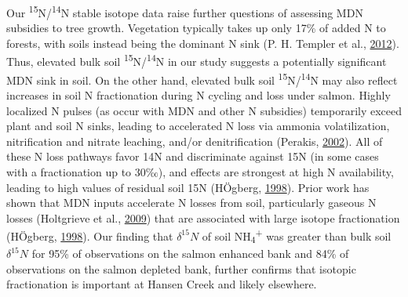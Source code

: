 \documentclass [11pt, proquest] {uwthesis}[2015/03/03]
\begin{document}
Our \textsuperscript{15}N/\textsuperscript{14}N stable isotope data
raise further questions of assessing MDN subsidies to tree growth.
Vegetation typically takes up only 17\% of added N to forests, with
soils instead being the dominant N sink (P. H. Templer et al.,
\protect\hyperlink{ref-Templer2012}{2012}). Thus, elevated bulk soil
\textsuperscript{15}N/\textsuperscript{14}N in our study suggests a
potentially significant MDN sink in soil. On the other hand, elevated
bulk soil \textsuperscript{15}N/\textsuperscript{14}N may also reflect
increases in soil N fractionation during N cycling and loss under
salmon. Highly localized N pulses (as occur with MDN and other N
subsidies) temporarily exceed plant and soil N sinks, leading to
accelerated N loss via ammonia volatilization, nitrification and nitrate
leaching, and/or denitrification (Perakis,
\protect\hyperlink{ref-Perakis2002}{2002}). All of these N loss pathways
favor 14N and discriminate against 15N (in some cases with a
fractionation up to 30‰), and effects are strongest at high N
availability, leading to high values of residual soil 15N (HÖgberg,
\protect\hyperlink{ref-Hogberg1998}{1998}). Prior work has shown that
MDN inputs accelerate N losses from soil, particularly gaseous N losses
(Holtgrieve et al., \protect\hyperlink{ref-Holtgrieve2009}{2009}) that
are associated with large isotope fractionation (HÖgberg,
\protect\hyperlink{ref-Hogberg1998}{1998}). Our finding that
\(\delta^{15}N\) of soil NH\textsubscript{4}\textsuperscript{+} was
greater than bulk soil \(\delta^{15}N\) for 95\% of observations on the
salmon enhanced bank and 84\% of observations on the salmon depleted
bank, further confirms that isotopic fractionation is important at
Hansen Creek and likely elsewhere.
\end{document}

